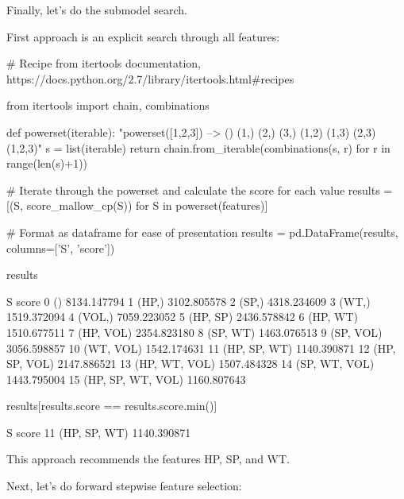 Finally, let's do the submodel search.

First approach is an explicit search through all features:

\begin{python}
# Recipe from itertools documentation, https://docs.python.org/2.7/library/itertools.html#recipes

from itertools import chain, combinations

def powerset(iterable):
    "powerset([1,2,3]) --> () (1,) (2,) (3,) (1,2) (1,3) (2,3) (1,2,3)"
    s = list(iterable)
    return chain.from_iterable(combinations(s, r) for r in range(len(s)+1))
\end{python}

\begin{python}
# Iterate through the powerset and calculate the score for each value
results = [(S, score_mallow_cp(S)) for S in powerset(features)]
    
# Format as dataframe for ease of presentation
results = pd.DataFrame(results, columns=['S', 'score'])
\end{python}

\begin{python}
results
\end{python}

\begin{console}
                    S        score
0                  ()  8134.147794
1               (HP,)  3102.805578
2               (SP,)  4318.234609
3               (WT,)  1519.372094
4              (VOL,)  7059.223052
5            (HP, SP)  2436.578842
6            (HP, WT)  1510.677511
7           (HP, VOL)  2354.823180
8            (SP, WT)  1463.076513
9           (SP, VOL)  3056.598857
10          (WT, VOL)  1542.174631
11       (HP, SP, WT)  1140.390871
12      (HP, SP, VOL)  2147.886521
13      (HP, WT, VOL)  1507.484328
14      (SP, WT, VOL)  1443.795004
15  (HP, SP, WT, VOL)  1160.807643
\end{console}
       
\begin{python}
results[results.score == results.score.min()]
\end{python}

\begin{console}
               S        score
11  (HP, SP, WT)  1140.390871
\end{console}

This approach recommends the features HP, SP, and WT.

Next, let's do forward stepwise feature selection:

